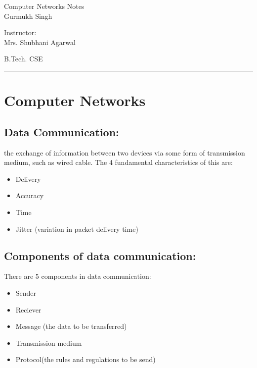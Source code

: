 \documentclass[11pt,letterpaper]{article}
\begin{document}
\begin{center}
  \Huge{Computer Networks Notes}\\
  \vspace{0.25cm}
  \small{Gurmukh Singh}
\end{center}

\vspace{-1.75cm}

\begin{flushright}
  Instructor: \\ Mrs. Shubhani Agarwal
\end{flushright}

\vspace{-1.3cm}

\begin{flushleft}
  B.Tech. CSE
\end{flushleft}

\rule{15.5cm}{0.1mm}%

\tableofcontents
\pagebreak


\section{Computer Networks}

\subsection{Data Communication:}

the exchange of information between two devices via some form of transmission medium, such as wired cable. The 4 fundamental characteristics of this are:
\begin{itemize}
  \item Delivery
  \item Accuracy
  \item Time
  \item Jitter (variation in packet delivery time)
\end{itemize}

\subsection{Components of data communication:}
There are 5 components in data communication: 
\begin{itemize}
  \item Sender
  \item Reciever
  \item Message (the data to be transferred)
  \item Transmission medium
  \item Protocol(the rules and regulations to be send)
\end{itemize}
\end{document}
